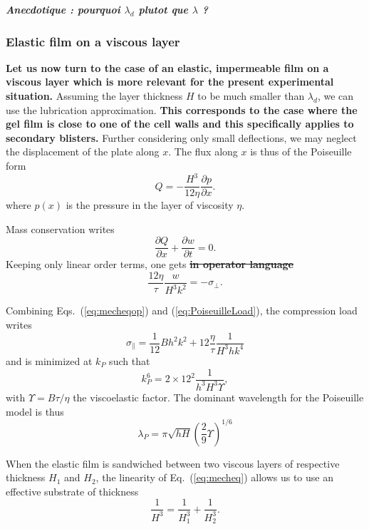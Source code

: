 \documentclass[twocolumn,superscriptaddress,showpacs,preprintnumbers,
amsmath,amssymb,prl]{revtex4-1}
\newcommand{\seb}[1]{\textbf{\color{blue}#1}} %
\newcommand{\sseb}[1]{\sout{\textbf{\color{blue}#1}}} %
\begin{document}
\seb{\it Anecdotique : pourquoi $\lambda_d$ plutot que $\lambda$ ?}

\subsubsection*{Elastic film on a viscous layer}
\seb{Let us now turn to the case of an elastic, impermeable film on a viscous layer which is more relevant for the present experimental situation.} Assuming the layer thickness $H$ to be much smaller than $\lambda_d$, we can use the lubrication approximation. \seb{This corresponds to the case where the gel film is close to one of the cell walls and this specifically applies to secondary blisters.} Further considering only small deflections, we may neglect the displacement of the plate along $x$. The flux along $x$ is thus of the Poiseuille form
\begin{equation}
Q = -\frac{H^3}{12\eta}\frac{\partial p}{\partial x}.
\label{eq:PoiseuilleFlux}
\end{equation}
where $p(x)$ is the pressure in the layer of viscosity $\eta$.

Mass conservation writes
\begin{equation}
\frac{\partial Q}{\partial x} + \frac{\partial w}{\partial t} = 0.
\label{eq:conservation}
\end{equation}
Keeping only linear order terms, one gets \sseb{in operator language}
\begin{equation}
\frac{12\eta}{\tau} \frac{w}{H^3k^2} = -\sigma_\perp.
\label{eq:PoiseuilleLoad}
\end{equation}

Combining Eqs.~(\ref{eq:mecheqop}) and (\ref{eq:PoiseuilleLoad}), the compression load writes
\begin{equation}
\sigma_\parallel = \frac{1}{12}B h^2 k^2 + 12\frac{\eta}{\tau}\frac{1}{H^3 h k^4}
\label{eq:sigma0P}
\end{equation}
and is minimized at $k_P$ such that
\begin{equation}
k_P^6 = 2\times 12^2 \frac{1}{h^3H^3\Upsilon},
\label{eq:kP}
\end{equation}
with $\Upsilon = B\tau/\eta$ the viscoelastic factor. The dominant wavelength for the Poiseuille model is thus
\begin{equation}
\lambda_P = \pi\sqrt{hH}\left(\frac{2}{9}\Upsilon\right)^{1/6}
\end{equation}

When the elastic film is sandwiched between two viscous layers of respective thickness $H_1$ and $H_2$, the linearity of Eq.~(\ref{eq:mecheq}) allows us to use an effective substrate of thickness 
\begin{equation}
\frac{1}{H^3} = \frac{1}{H_1^3}+\frac{1}{H_2^3}.
\end{equation}
\end{document}
